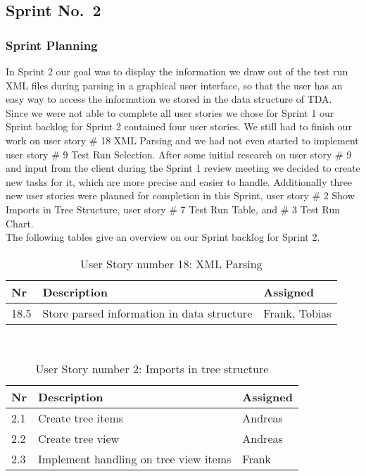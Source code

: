 \subsection{Sprint No.~2}

\subsubsection*{Sprint Planning}

In Sprint 2 our goal was to display the information we draw out of the test run XML files during parsing in a graphical user interface, so that the user has an easy way to access the information we stored in the data structure of TDA. \\ 
Since we were not able to complete all user stories we chose for Sprint 1 our Sprint backlog for Sprint 2 contained four user stories. We still had to finish our work on user story \# 18 XML Parsing and we had not even started to implement user story \# 9 Test Run Selection. After some initial research on user story \# 9 and input from the client during the Sprint 1 review meeting we decided to create new tasks for it, which are more precise and easier to handle. Additionally three new user stories were planned for completion in this Sprint, user story \# 2 Show Imports in Tree Structure, user story \# 7 Test Run Table, and \# 3 Test Run Chart. \\ 
The following tables give an overview on our Sprint backlog for Sprint 2. \\ 

\begin{table}[h]
  \caption{User Story number 18: XML Parsing}
  \label{US_Parsing2}
  \centering
  \begin{tabular}{p{1cm}|p{5cm}|p{3cm}|}
  	Nr & Description & Assigned \\ 
  	\hline
  	18.5 & Store parsed information in data structure & Frank, Tobias \\ 
  	\hline
  \end{tabular}
\end{table} 

\ \\

\begin{table}[h]
  \caption{User Story number 2: Imports in tree structure}
  \label{US_Tree}
  \centering
  \begin{tabular}{p{1cm}|p{5cm}|p{3cm}|}
  	Nr & Description & Assigned \\ 
  	\hline
  	2.1 & Create tree items & Andreas \\ 
  	\hline
  	2.2 & Create tree view & Andreas \\ 
  	\hline 
  	2.3 & Implement handling on tree view items & Frank \\ 
  	\hline
  \end{tabular}
\end{table} 

